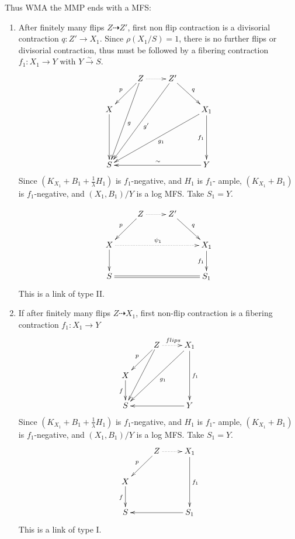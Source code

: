 \documentclass{article}
\begin{document}
\begin{enumerate}[(A)]
\begin{enumerate}[a)]
  \end{enumerate}  
  Thus WMA the MMP ends with a MFS:
  \begin{enumerate}[1)]
    \item After finitely many flips $ Z\dashrightarrow Z' $, first non flip contraction is a divisorial contraction $ q:Z'\to X_1 $. Since $ \rho(X_1/S)=1 $, there is no further flips or divisorial contraction, thus must be followed by a fibering contraction $ f_1:X_1\to Y $ with $ Y\xrightarrow{\sim}S $.
    $$ \xymatrix{
      &Z\ar[lddd]^g\ar[ld]_p\ar@{.>}[r]&Z'\ar[dr]^{q}\ar[llddd]^{g'}&\\
      X\ar[dd]&&&X_1\ar[dd]_{f_1}\ar[ddlll]^{g_1}\\
      &&&\\
      S&&&Y\ar[lll]_{\sim}} $$
    Since $ (K_{X_1}+B_1+\frac{1}{\lambda}H_1) $ is $ f_1 $-negative, and $ H_1 $ is $ f_1 $- ample, $ (K_{X_1}+B_1) $ is $ f_1 $-negative, and $ (X_1,B_1)/Y $ is a log MFS.  Take $ S_1=Y $.
    
    $$ \xymatrix{
      &Z\ar[ld]_p\ar@{.>}[r]&Z'\ar[dr]^{q}&\\
      X\ar[d]\ar@{.>}[rrr]^{\psi_1}&&&X_1\ar[d]_{f_1}\\
      S\ar@{=}[rrr]&&&S_1} $$
    This is a link of type II.
    \item If after finitely many flips $ Z\dashrightarrow X_1 $, first non-flip contraction is a fibering contraction $ f_1:X_1\to Y  $ 
    $$ \xymatrix{
      &Z\ar[ld]_p\ar[ldd]\ar@{.>}[r]^{flips}&X_1\ar[lldd]^{g_1}\ar[dd]^{f_1}\\
      X\ar[d]_f&&\\
      S &&Y\ar[ll]}$$
    Since $ (K_{X_1}+B_1+\frac{1}{\lambda}H_1) $ is $ f_1 $-negative, and $ H_1 $ is $ f_1 $- ample, $ (K_{X_1}+B_1) $ is $ f_1 $-negative, and $ (X_1,B_1)/Y $ is a log MFS.  Take $ S_1=Y $.
    $$ \xymatrix{
      &Z\ar[ld]_p\ar@{.>}[r]&X_1\ar[dd]^{f_1}\\
      X\ar[d]_f&&\\
      S &&S_1\ar[ll]}$$
    This is a link of type I.
  \end{enumerate} 
\end{enumerate}
\end{document}
